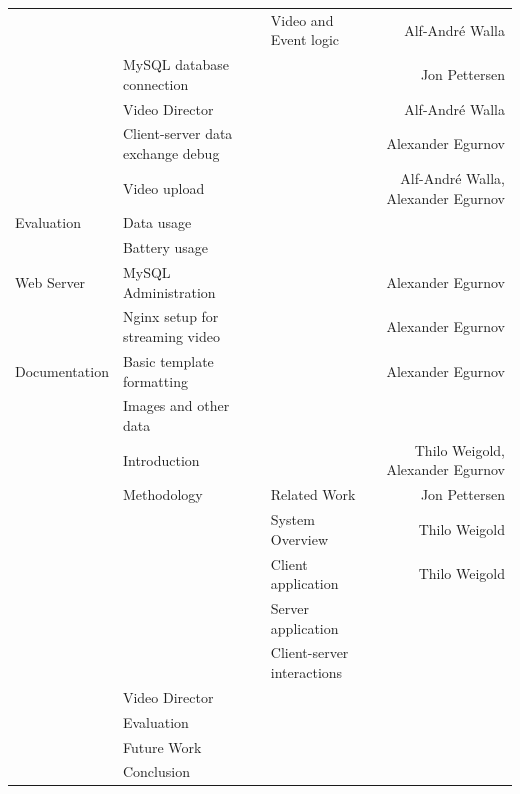 \documentclass[conference]{IEEEtran}
\begin{document}
\begin{table}[t]
\begin{tabular}{lllr}
			&       & Video and Event logic & Alf-André Walla \\
			& MySQL database connection & & Jon Pettersen \\
			& Video Director & & Alf-André Walla \\
			& Client-server data exchange debug & & Alexander Egurnov \\
			& Video upload & & Alf-André Walla, Alexander Egurnov \\
		\midrule
		Evaluation
			& Data usage & & \\
			& Battery usage & & \\
		\midrule
		Web Server
			& MySQL Administration & & Alexander Egurnov \\
			& Nginx setup for streaming video & & Alexander Egurnov \\
		\midrule
		Documentation 
			& Basic template formatting & & Alexander Egurnov \\
			& Images and other data & & \\
			& Introduction & & Thilo Weigold, Alexander Egurnov \\
			& Methodology & Related Work & Jon Pettersen \\
			&       & System Overview & Thilo Weigold \\
			&		& Client application & Thilo Weigold \\
			&		& Server application & \\
			&		& Client-server interactions & \\
			& Video Director & & \\
			& Evaluation & & \\
			& Future Work & & \\
			& Conclusion & & \\
		\bottomrule
    \end{tabular}%
\end{table}%

\vfill
\end{document}
